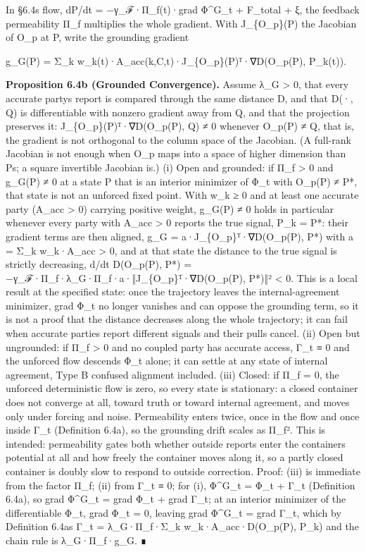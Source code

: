 \documentclass[
]{article}
\begin{document}
In §6.4\textquotesingle s flow, dP/dt = −γ\_ℱ·Π\_f(t)·grad Φ\^{}G\_t +
F\_total + ξ, the feedback permeability Π\_f multiplies the whole
gradient. With J\_\{O\_p\}(P) the Jacobian of O\_p at P, write the
grounding gradient

g\_G(P) = Σ\_k w\_k(t)·A\_acc(k,C,t)·J\_\{O\_p\}(P)ᵀ·∇D(O\_p(P),
P\_k(t)).

\textbf{Proposition 6.4b (Grounded Convergence).} Assume λ\_G
\textgreater{} 0, that every accurate party\textquotesingle s report is
compared through the same distance D, and that D(·, Q) is differentiable
with nonzero gradient away from Q, and that the projection preserves it:
J\_\{O\_p\}(P)ᵀ·∇D(O\_p(P), Q) ≠ 0 whenever O\_p(P) ≠ Q, that is, the
gradient is not orthogonal to the column space of the Jacobian. (A
full-rank Jacobian is not enough when O\_p maps into a space of higher
dimension than P\textquotesingle s; a square invertible Jacobian is.)
(i) Open and grounded: if Π\_f \textgreater{} 0 and g\_G(P) ≠ 0 at a
state P that is an interior minimizer of Φ\_t with O\_p(P) ≠ P*, that
state is not an unforced fixed point. With w\_k ≥ 0 and at least one
accurate party (A\_acc \textgreater{} 0) carrying positive weight,
g\_G(P) ≠ 0 holds in particular whenever every party with A\_acc
\textgreater{} 0 reports the true signal, P\_k = P*: their gradient
terms are then aligned, g\_G = a·J\_\{O\_p\}ᵀ·∇D(O\_p(P), P*) with a =
Σ\_k w\_k·A\_acc \textgreater{} 0, and at that state the distance to the
true signal is strictly decreasing, d/dt D(O\_p(P), P*) =
−γ\_ℱ·Π\_f·λ\_G·Π\_f·a·‖J\_\{O\_p\}ᵀ·∇D(O\_p(P), P*)‖² \textless{} 0.
This is a local result at the specified state: once the trajectory
leaves the internal-agreement minimizer, grad Φ\_t no longer vanishes
and can oppose the grounding term, so it is not a proof that the
distance decreases along the whole trajectory; it can fail when accurate
parties report different signals and their pulls cancel. (ii) Open but
ungrounded: if Π\_f \textgreater{} 0 and no coupled party has accurate
access, Γ\_t ≡ 0 and the unforced flow descends Φ\_t alone; it can
settle at any state of internal agreement, Type B confused alignment
included. (iii) Closed: if Π\_f = 0, the unforced deterministic flow is
zero, so every state is stationary: a closed container does not converge
at all, toward truth or toward internal agreement, and moves only under
forcing and noise. Permeability enters twice, once in the flow and once
inside Γ\_t (Definition 6.4a), so the grounding drift scales as Π\_f².
This is intended: permeability gates both whether outside reports enter
the container\textquotesingle s potential at all and how freely the
container moves along it, so a partly closed container is doubly slow to
respond to outside correction. Proof: (iii) is immediate from the factor
Π\_f; (ii) from Γ\_t ≡ 0; for (i), Φ\^{}G\_t = Φ\_t + Γ\_t (Definition
6.4a), so grad Φ\^{}G\_t = grad Φ\_t + grad Γ\_t; at an interior
minimizer of the differentiable Φ\_t, grad Φ\_t = 0, leaving grad
Φ\^{}G\_t = grad Γ\_t, which by Definition 6.4a\textquotesingle s Γ\_t =
λ\_G·Π\_f·Σ\_k w\_k·A\_acc·D(O\_p(P), P\_k) and the chain rule is
λ\_G·Π\_f·g\_G. ∎
\end{document}
